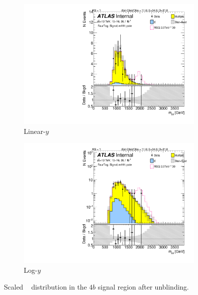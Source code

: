 \begin{figure}[htb!]
\begin{center}
    \captionsetup{justification=centering}
    \begin{subfigure}[b]{0.45\textwidth}
        \includegraphics[width=\textwidth,angle=-90]{figures/boosted/Signal_Syst/Moriond_bkg_9_FourTag_Signal_mHH_pole.pdf}
        \caption{Linear-$y$}
        \label{fig:boosted-4b-signal-pole-lin}
    \end{subfigure}
    \quad
    \begin{subfigure}[b]{0.45\textwidth}
        \includegraphics[width=\textwidth,angle=-90]{figures/boosted/Signal_Syst/Moriond_bkg_9_FourTag_Signal_mHH_pole_1.pdf}
        \caption{Log-$y$}
        \label{fig:boosted-4b-signal-pole-log}
    \end{subfigure}
  \caption{Scaled \mtwoJ~ distribution in the $4b$ signal region after unblinding.}
  \label{fig:boosted-4b-signal-pole}
\end{center}
\end{figure}


